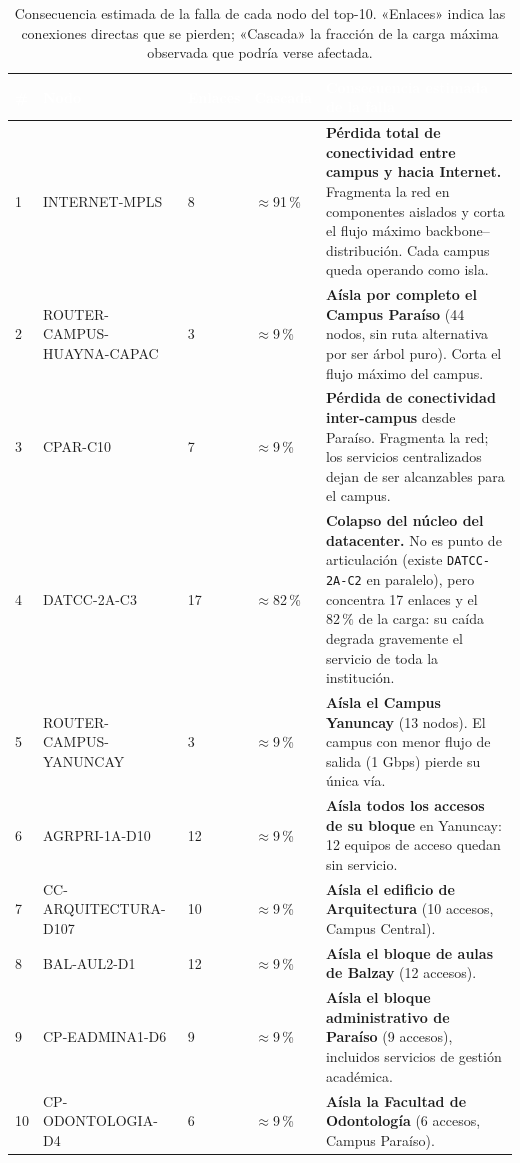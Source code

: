 \documentclass[11pt, a4paper]{article}
\newcommand{\encabezado}[1]{%
    \cellcolor{tabhead}\textcolor{white}{\textbf{#1}}}
\begin{document}
\begin{table}[htbp]
\centering
\caption{Consecuencia estimada de la falla de cada nodo del top-10.
         «Enlaces» indica las conexiones directas que se pierden;
         «Cascada» la fracción de la carga máxima observada que podría
         verse afectada.}
\label{tab:consecuencias}
\scriptsize
\begin{tabular}{C{0.5cm} L{3.5cm} C{1.1cm} C{1.1cm} L{6.4cm}}
    \toprule
    \encabezado{\#} & \encabezado{Nodo} &
    \encabezado{Enlaces} & \encabezado{Cascada} &
    \encabezado{Consecuencia estimada de la falla} \\
    \midrule
    1 & INTERNET-MPLS & 8 & $\approx$91\,\%
      & \textbf{Pérdida total de conectividad entre campus y hacia
        Internet.} Fragmenta la red en componentes aislados y corta el
        flujo máximo backbone--distribución. Cada campus queda operando
        como isla. \\
    2 & ROUTER-CAMPUS-HUAYNA-CAPAC & 3 & $\approx$9\,\%
      & \textbf{Aísla por completo el Campus Paraíso} (44 nodos, sin ruta
        alternativa por ser árbol puro). Corta el flujo máximo del campus. \\
    3 & CPAR-C10 & 7 & $\approx$9\,\%
      & \textbf{Pérdida de conectividad inter-campus} desde Paraíso.
        Fragmenta la red; los servicios centralizados dejan de ser
        alcanzables para el campus. \\
    4 & DATCC-2A-C3 & 17 & $\approx$82\,\%
      & \textbf{Colapso del núcleo del datacenter.} No es punto de
        articulación (existe \texttt{DATCC-2A-C2} en paralelo), pero
        concentra 17 enlaces y el $82\,\%$ de la carga: su caída degrada
        gravemente el servicio de toda la institución. \\
    5 & ROUTER-CAMPUS-YANUNCAY & 3 & $\approx$9\,\%
      & \textbf{Aísla el Campus Yanuncay} (13 nodos). El campus con menor
        flujo de salida (1 Gbps) pierde su única vía. \\
    6 & AGRPRI-1A-D10 & 12 & $\approx$9\,\%
      & \textbf{Aísla todos los accesos de su bloque} en Yanuncay: 12
        equipos de acceso quedan sin servicio. \\
    7 & CC-ARQUITECTURA-D107 & 10 & $\approx$9\,\%
      & \textbf{Aísla el edificio de Arquitectura} (10 accesos, Campus
        Central). \\
    8 & BAL-AUL2-D1 & 12 & $\approx$9\,\%
      & \textbf{Aísla el bloque de aulas de Balzay} (12 accesos). \\
    9 & CP-EADMINA1-D6 & 9 & $\approx$9\,\%
      & \textbf{Aísla el bloque administrativo de Paraíso} (9 accesos),
        incluidos servicios de gestión académica. \\
    10 & CP-ODONTOLOGIA-D4 & 6 & $\approx$9\,\%
      & \textbf{Aísla la Facultad de Odontología} (6 accesos, Campus
        Paraíso). \\
    \bottomrule
\end{tabular}
\end{table}
\end{document}
